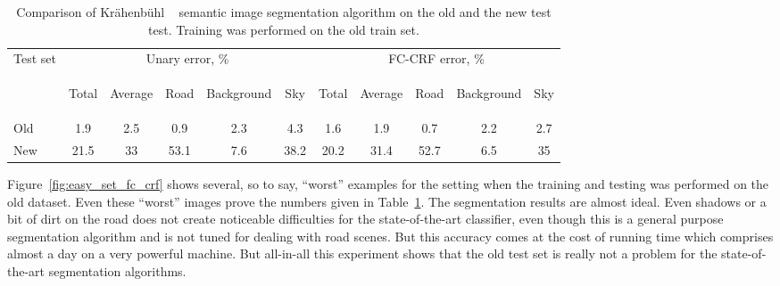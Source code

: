 \begin{table}[t]
 \centering
 \begin{tabular}{|l|c|c|c|c|c||c|c|c|c|c|}
 \hline
  \multirow{2}{*}{Test set} & \multicolumn{5}{|c||}{Unary error, \%} & \multicolumn{5}{|c|}{FC-CRF error, \%} \\
  \cline{2-11}
   & \begin{sideways}Total\end{sideways} & \begin{sideways}Average\end{sideways} & \begin{sideways}Road\end{sideways} & \begin{sideways}Background\end{sideways} & \begin{sideways}Sky\end{sideways} & \begin{sideways}Total\end{sideways} & \begin{sideways}Average\end{sideways} & \begin{sideways}Road\end{sideways} & \begin{sideways}Background\end{sideways} & \begin{sideways}Sky\end{sideways} \\
  \hline
  Old & 1.9 & 2.5 & 0.9 & 2.3 & 4.3 & 1.6 & 1.9 & 0.7 & 2.2 & 2.7 \\
  \hline
  New & 21.5 & 33 & 53.1 & 7.6 & 38.2 & 20.2 & 31.4 & 52.7 & 6.5 & 35 \\
  \hline
 \end{tabular}
  \caption{Comparison of Kr\"ahenb\"uhl \etal~\cite{Krahenbuhl2011} semantic image segmentation algorithm on the old and the new test test. Training was performed
  on the old train set.}
\label{tab:old_new_comparison}
\end{table}

Figure~\ref{fig:easy_set_fc_crf} shows several, so to say, ``worst'' examples for the setting when the training and testing was performed on the 
old dataset. Even 
these ``worst'' images prove the numbers given in Table~\ref{tab:old_new_comparison}. The segmentation results are almost ideal. Even shadows or a bit
of dirt on the road does not create noticeable difficulties for the state-of-the-art classifier, even though this is a general purpose segmentation
algorithm and is not tuned for dealing with road scenes. But this accuracy comes at the cost of running time which comprises almost a day on a very
powerful machine. But all-in-all this experiment shows that the old test set is really not a problem for the state-of-the-art segmentation algorithms.

